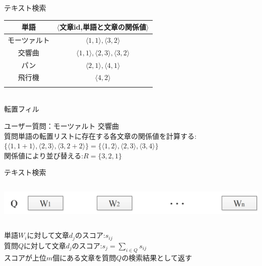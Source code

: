 \documentclass[14pt,xcolor=dvipsnames,table,dvipdfmx]{beamer}
\begin{document}
\begin{frame}{テキスト検索}
\fontsize{12pt}{7.2}\selectfont
		\center
		\begin{tabular}{|c|c|}
		\noalign{\hrule height 1pt}
		単語 & $\langle$文章id,単語と文章の関係値$\rangle$ \\
		\hline
		モーツァルト & $\langle1,1\rangle,\langle3,2\rangle$\\
		交響曲 & $\langle1,1\rangle,\langle2,3\rangle,\langle3,2\rangle$ \\
		パン & $\langle2,1\rangle,\langle4,1\rangle$ \\
		飛行機 & $\langle4,2\rangle$ \\
		\noalign{\hrule height 1pt}
		\end{tabular}\\
		\center
		転置フィル
	\begin{block}{}
	ユーザー質問：モーツァルト 交響曲 \\
	
	質問単語の転置リストに存在する各文章の関係値を計算する:\\
	$\{ \langle1,1+1\rangle,\langle2,3\rangle,\langle3,2+2\rangle \} = \{ \langle1,2\rangle,\langle2,3\rangle,\langle3,4\rangle \}$\\
	関係値により並び替える:$R = \{ 3,2,1 \}$
	\end{block}
\end{frame}

\begin{frame}{テキスト検索}
\fontsize{12pt}{7.2}\selectfont
	\begin{columns}[t]
		\begin{column}{0.8\textwidth} %
			\includegraphics[width=\columnwidth]{rk9.png}
		\end{column}
	\end{columns}
	\begin{block}{}
		単語$W_i$に対して文章$d_j$のスコア:$s_{ij}$ \\
		質問$Q$に対して文章$d_j$のスコア:$s_{j}=\sum_{i \in Q}s_{ij}$ \\
		スコアが上位$m$個にある文章を質問$Q$の検索結果として返す
	\end{block}
\end{frame}
\end{document}
